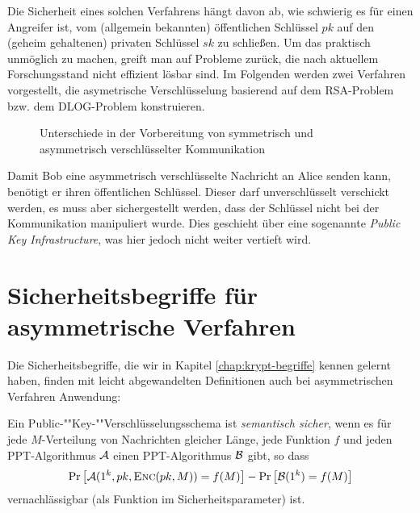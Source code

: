Die Sicherheit eines solchen Verfahrens hängt davon ab, wie schwierig es
für einen Angreifer ist, vom (allgemein bekannten) öffentlichen
Schlüssel $pk$ auf den (geheim gehaltenen) privaten Schlüssel $sk$ zu
schließen. Um das praktisch unmöglich zu machen, greift man auf Probleme
zurück, die nach aktuellem Forschungsstand nicht effizient lösbar
sind. Im Folgenden werden zwei Verfahren vorgestellt, die asymetrische
Verschlüsselung basierend auf dem RSA-Problem bzw. dem DLOG-Problem
konstruieren. 

\begin{figure}
\caption{Unterschiede in der Vorbereitung von symmetrisch und
  asymmetrisch verschlüsselter Kommunikation}
\label{fig:asymmenc-symmenc}
\end{figure}
Damit Bob eine asymmetrisch verschlüsselte Nachricht an Alice senden
kann, benötigt er ihren öffentlichen Schlüssel. Dieser darf
unverschlüsselt verschickt werden, es muss aber sichergestellt werden,
dass der Schlüssel nicht bei der Kommunikation manipuliert wurde. Dies
geschieht über eine sogenannte \textit{Public Key Infrastructure}, was
hier jedoch nicht weiter vertieft wird.
\section{Sicherheitsbegriffe für asymmetrische Verfahren}
Die Sicherheitsbegriffe, die wir in Kapitel \ref{chap:krypt-begriffe}
kennen gelernt haben, finden mit leicht abgewandelten Definitionen auch
bei asymmetrischen Verfahren Anwendung:

\begin{definition}
Ein Pub\-lic-""Key-""Ver\-schlüs\-sel\-ungs\-sche\-ma ist \textit{semantisch sicher}, wenn es für jede $M$-Verteilung von Nachrichten gleicher Länge, jede
Funktion $f$ und jeden PPT-Algorithmus $\mathcal{A}$ einen PPT-Algorithmus $\mathcal{B}$ gibt, so dass
\begin{equation*}
\Pr\left[\mathcal{A}(1^k, pk, \textsc{Enc}(pk, M)) = f(M)\right] - \Pr\left[\mathcal{B}(1^k) = f(M)\right]
\end{equation*}
vernachlässigbar (als Funktion im Sicherheitsparameter) ist.
\end{definition}

